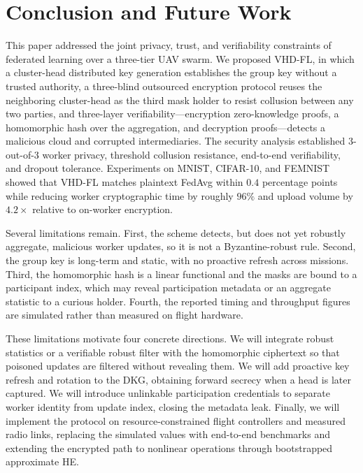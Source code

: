 \section{Conclusion and Future Work}
\label{sec:conclusion}

This paper addressed the joint privacy, trust, and verifiability constraints of federated learning over a three-tier UAV swarm. We proposed \textsc{VHD-FL}, in which a cluster-head distributed key generation establishes the group key without a trusted authority, a three-blind outsourced encryption protocol reuses the neighboring cluster-head as the third mask holder to resist collusion between any two parties, and three-layer verifiability---encryption zero-knowledge proofs, a homomorphic hash over the aggregation, and decryption proofs---detects a malicious cloud and corrupted intermediaries. The security analysis established 3-out-of-3 worker privacy, threshold collusion resistance, end-to-end verifiability, and dropout tolerance. Experiments on MNIST, CIFAR-10, and FEMNIST showed that \textsc{VHD-FL} matches plaintext FedAvg within $0.4$ percentage points while reducing worker cryptographic time by roughly $96\%$ and upload volume by $4.2\times$ relative to on-worker encryption.

Several limitations remain. First, the scheme detects, but does not yet robustly aggregate, malicious worker updates, so it is not a Byzantine-robust rule. Second, the group key is long-term and static, with no proactive refresh across missions. Third, the homomorphic hash is a linear functional and the masks are bound to a participant index, which may reveal participation metadata or an aggregate statistic to a curious holder. Fourth, the reported timing and throughput figures are simulated rather than measured on flight hardware.

These limitations motivate four concrete directions. We will integrate robust statistics or a verifiable robust filter with the homomorphic ciphertext so that poisoned updates are filtered without revealing them. We will add proactive key refresh and rotation to the DKG, obtaining forward secrecy when a head is later captured. We will introduce unlinkable participation credentials to separate worker identity from update index, closing the metadata leak. Finally, we will implement the protocol on resource-constrained flight controllers and measured radio links, replacing the simulated values with end-to-end benchmarks and extending the encrypted path to nonlinear operations through bootstrapped approximate HE.
